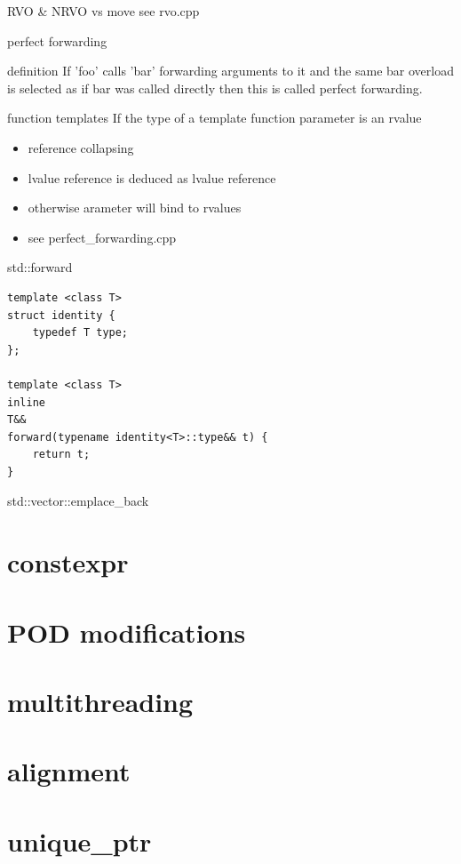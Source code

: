 \documentclass{beamer}
\begin{document}
\begin{frame}{RVO & NRVO vs move}
  see rvo.cpp
\end{frame}

\begin{frame}{perfect forwarding}
  \begin{block}{definition}
    If 'foo' calls 'bar' forwarding arguments to it and the same bar
    overload is selected as if bar was called directly then this is
    called perfect forwarding.
  \end{block}
  \begin{block}{function templates}
    If the type of a template function parameter is an rvalue
    \begin{itemize}
    \item reference collapsing
    \item lvalue reference is deduced as lvalue reference
    \item otherwise arameter will bind to rvalues
    \item see perfect\_forwarding.cpp
    \end{itemize}
  \end{block}
\end{frame}

\begin{frame}{std::forward}
\begin{verbatim}
template <class T>
struct identity {
    typedef T type;
};

template <class T>
inline
T&&
forward(typename identity<T>::type&& t) {
    return t;
}
\end{verbatim}
\end{frame}

\begin{frame}{std::vector::emplace\_back}

\end{frame}


\section{constexpr}
\section{POD modifications}
\section{multithreading}
\section{alignment}
\section{unique\_ptr}
\end{document}

